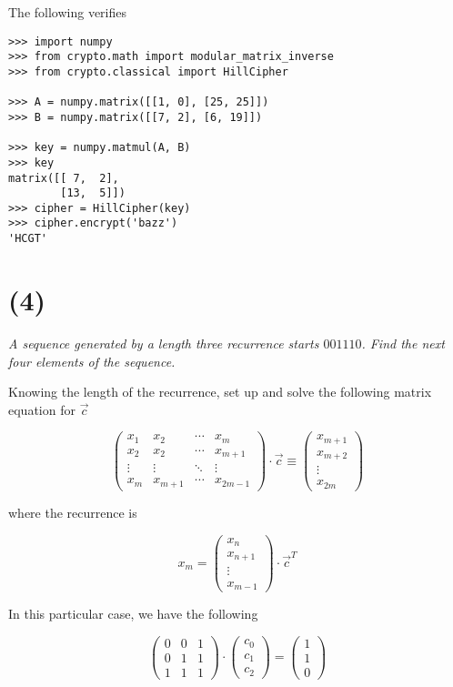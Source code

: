 \documentclass[12pt]{article}
\begin{document}
The following verifies

\begin{verbatim}
>>> import numpy
>>> from crypto.math import modular_matrix_inverse
>>> from crypto.classical import HillCipher

>>> A = numpy.matrix([[1, 0], [25, 25]])
>>> B = numpy.matrix([[7, 2], [6, 19]])

>>> key = numpy.matmul(A, B)
>>> key
matrix([[ 7,  2],
        [13,  5]])
>>> cipher = HillCipher(key)
>>> cipher.encrypt('bazz')
'HCGT'
\end{verbatim}

\section*{(4)} \textit{A sequence generated by a length three recurrence starts $001110$. Find the next four elements of the sequence.}

Knowing the length of the recurrence, set up and solve the following matrix equation for $\vec{c}$

$$\begin{pmatrix}x_1 & x_2 & \cdots & x_m \\ x_2 & x_2 & \cdots & x_{m+1} \\ \vdots & \vdots & \ddots & \vdots \\ x_m & x_{m+1} & \cdots & x_{2m - 1}\end{pmatrix} \cdot \vec{c} \equiv \begin{pmatrix}x_{m+1} \\ x_{m+2} \\ \vdots \\ x_{2m}\end{pmatrix}$$

where the recurrence is

$$x_m = \begin{pmatrix}x_{n} \\ x_{n + 1} \\ \vdots \\ x_{m - 1}\end{pmatrix} \cdot \vec{c}^T$$

In this particular case, we have the following

$$\begin{pmatrix}0 & 0 & 1 \\ 0 & 1 & 1 \\ 1 & 1 & 1\end{pmatrix}\cdot\begin{pmatrix}c_0 \\ c_1 \\ c_2\end{pmatrix} = \begin{pmatrix}1 \\ 1 \\ 0\end{pmatrix}$$
\end{document}
